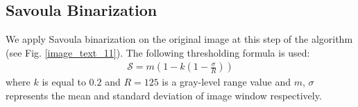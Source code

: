 \documentclass[runningheads]{llncs}
\begin{document}
\subsection{Savoula Binarization} \label{savoulaBin} We apply Savoula binarization \cite{Sauvola2000} on the original image at this step of the algorithm (see Fig. \ref{image_text_11}). The following thresholding formula is used:
\begin{equation}
\begin{split}
\mathcal{S} = m(1-k(1-\frac{\sigma}{R}))
\end{split} 
\label{savoulaThresh}
\end{equation}
where $ k$ is equal to $0.2$ and $R = 125$ is a gray-level range value and $m$, $\sigma$ represents the mean and standard deviation of image window respectively. 
\end{document}
